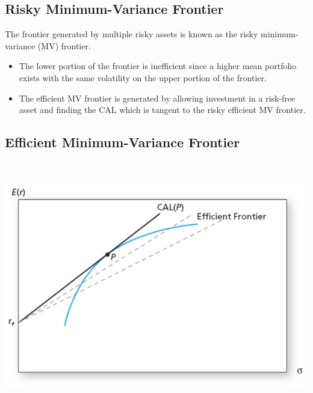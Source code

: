 \documentclass[letterpaper,10pt,english]{sphinxmanual}
\begin{document}
\subsection{Risky Minimum-Variance Frontier}
\label{multiAssetOpt:id4}
The frontier generated by multiple risky assets is known as the risky
minimum-variance (MV) frontier.
\begin{itemize}
\item {} 
The lower portion of the frontier is inefficient since a higher mean
portfolio exists with the same volatility on the upper portion of
the frontier.

\end{itemize}
\begin{itemize}
\item {} 
The efficient MV frontier is generated by allowing investment in a
risk-free asset and finding the CAL which is tangent to the risky
efficient MV frontier.

\end{itemize}


\subsection{Efficient Minimum-Variance Frontier}
\label{multiAssetOpt:efficient-minimum-variance-frontier}
$\qquad$

\includegraphics[width=6in]{pg212_2.jpg}
\end{document}
